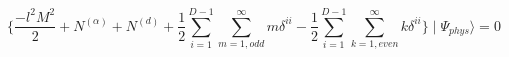 \begin{equation}
\{\frac{-l^{2}M^{2}}{2}+N^{(\alpha)}+N^{(d)}+\frac{1}{2}
\sum_{i=1}^{D-1}\sum_{m=1,odd}^{\infty}m\delta^{ii}-
\frac{1}{2}\sum_{i=1}^{D-1}\sum_{k=1,even}^{\infty}k
\delta^{ii}\}\mid\Psi_{phys}\rangle = 0
\end{equation}

